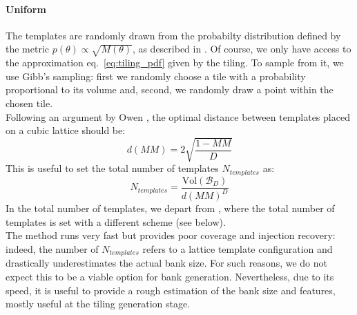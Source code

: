 \documentclass[twocolumn,showpacs,preprintnumbers,nofootinbib,prd,
superscriptaddress,10pt]{revtex4-2}
\newcommand{\stefano}[1]{{\textcolor{blue}{\texttt{SS: #1}} }}
\begin{document}
\paragraph{Uniform}\label{par:uniform}
The templates are randomly drawn from the probabilty distribution defined by the metric $p(\theta) \propto \sqrt{M(\theta)}$, as described in \cite{Messenger:2008ta}.
Of course, we only have access to the approximation eq.~\eqref{eq:tiling_pdf} given by the tiling. To sample from it, we use Gibb's sampling: first we randomly choose a tile with a probability proportional to its volume and, second, we randomly draw a point within the chosen tile.
\\
Following an argument by Owen \cite{owen_metric}, the optimal distance between templates placed on a cubic lattice should be:
\begin{equation}
	d(MM) = 2 \sqrt{\frac{1-MM}{D}}
\end{equation}
This is useful to set the total number of templates $N_{templates}$ as:
\begin{equation} \label{eq:N_templates}
	N_{templates} = \frac{\text{Vol}(\mathcal{B}_D)}{d(MM)^D}
\end{equation}
In the total number of templates, we depart from \cite{Messenger:2008ta}, where the total number of templates is set with a different scheme (see below).
\\
The method runs very fast but provides poor coverage and injection recovery: indeed, the number of $N_{templates}$ refers to a lattice template configuration and drastically underestimates the actual bank size.
For such reasons, we do not expect this to be a viable option for bank generation. Nevertheless, due to its speed, it is useful to provide a rough estimation of the bank size and features, mostly useful at the tiling generation stage.
\end{document}
